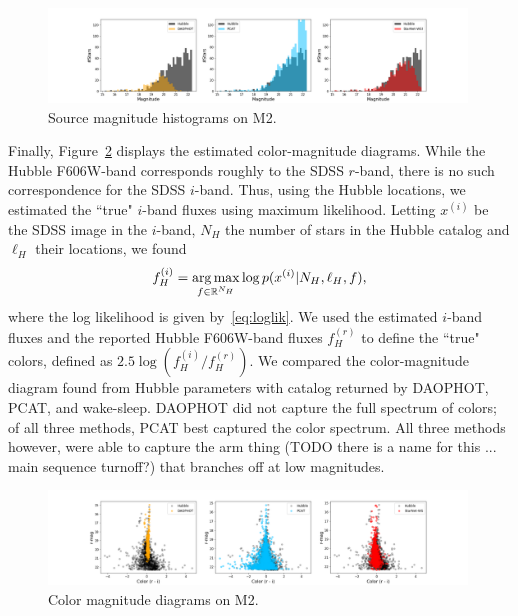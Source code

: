 \begin{figure}[ht]
    \centering
    \includegraphics[width=0.99\textwidth]{figures/luminosity_fun.png}
    \caption{Source magnitude histograms on M2. }
    \label{fig:luminosity_fun_m2}
\end{figure}

Finally, Figure~\ref{fig:cmd_m2} displays the estimated color-magnitude diagrams. While the Hubble F606W-band corresponds roughly to the SDSS $r$-band, there is no such correspondence for the SDSS $i$-band. Thus, using the Hubble locations, we estimated the ``true" $i$-band fluxes using maximum likelihood. Letting $x^{(i)}$ be the SDSS image in the $i$-band, $N_H$ the number of stars in the Hubble catalog and $\ell_H$ their locations, we found  
\begin{align}
   f^{(i)}_H = \operatorname*{arg\,max}_{f\in\mathbb{R}^{N_H}} \log p(x^{(i)} | N_H, \ell_H, f)
   \label{eq:optim_iband_flux},
\end{align}
where the log likelihood is given by~\eqref{eq:loglik}. We used the estimated $i$-band fluxes and the reported Hubble F606W-band fluxes $f_H^{(r)}$ to define the ``true" colors, defined as $2.5\log(f_H^{(i)}/f_H^{(r)})$. We compared
the color-magnitude diagram found from Hubble parameters with catalog returned by DAOPHOT, PCAT, and wake-sleep. DAOPHOT did not capture the full spectrum of colors; of all three methods, PCAT best captured the color spectrum. All three methods however, were able to capture the arm thing (TODO there is a name for this ... main sequence turnoff?) that branches off at low magnitudes. 

\begin{figure}[ht]
    \centering
    \includegraphics[width=0.99\textwidth]{figures/cmd.png}
    \caption{Color magnitude diagrams on M2. }
    \label{fig:cmd_m2}
\end{figure}



